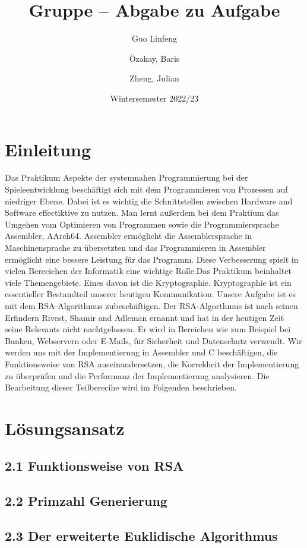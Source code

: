 \documentclass[course=asp]{aspdoc}
\author{Guo Linfeng \and Özakay, Baris \and Zheng, Julian}
\date{Wintersemester 2022/23} %
\title{Gruppe \theGroup{} -- Abgabe zu Aufgabe \theNumber}
\begin{document}
\maketitle

\section{Einleitung}
Das Praktikum Aspekte der systemnahen Programmierung bei der Spieleentwicklung beschäftigt sich mit dem Programmieren von Prozessen auf niedriger Ebene. Dabei ist es wichtig die Schnittstellen zwischen Hardware and Software effectiktive zu nutzen. Man lernt außerdem bei dem Praktium das Umgehen vom Optimieren von Programmen sowie die Programmiersprache Assembler, AArch64. Assembler ermöglicht die Assemblersprache in Maschinensprache zu übersetzten und das Programmieren in Assembler ermöglicht eine bessere Leistung für das Programm. Diese Verbesserung spielt in vielen Bereciehen der Informatik eine wichtige Rolle.\newline Das Praktikum beinhaltet viele Themengebiete. Eines davon ist die Kryptographie. Kryptographie ist ein essentieller Bestandteil unserer heutigen Kommunikation. Unsere Aufgabe ist es mit dem RSA-Algorithmus zubeschäftigen. Der RSA-Algorthmus ist nach seinen Erfindern Rivest, Shamir and Adleman ernannt und hat in der heutigen Zeit seine Relevants nicht nachtgelassen. Er wird in Bereichen wie zum Beispiel bei Banken, Webservern oder E-Mails, für Sicherheit und Datenschutz verwendt. Wir werden uns mit der Implementierung in Assembler und C beschäftigen, die Funktionsweise von RSA auseinandersetzen, die Korrekheit der Implementierung zu überprüfen und die Performanz der Implementierung analysieren. Die Bearbeitung dieser Teilberecihe wird im Folgenden beschrieben.

\section{Lösungsansatz}
\subsection*{2.1 Funktionsweise von RSA }
\subsection*{2.2 Primzahl Generierung }
\subsection*{2.3 Der erweiterte Euklidische Algorithmus}
\end{document}
